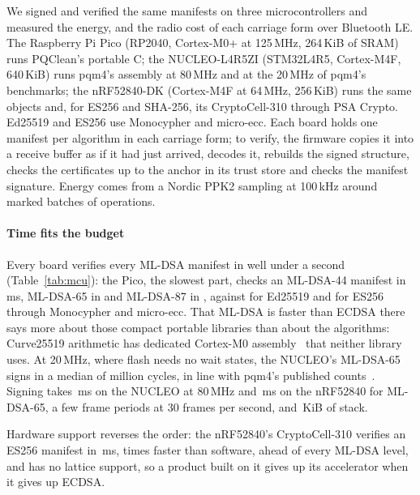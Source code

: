 We signed and verified the same manifests on three microcontrollers and
measured the energy, and the radio cost of each carriage form over Bluetooth
LE. The Raspberry Pi Pico (RP2040, Cortex-M0+ at 125\,MHz, 264\,KiB of SRAM)
runs PQClean's portable C; the NUCLEO-L4R5ZI (STM32L4R5, Cortex-M4F,
640\,KiB) runs pqm4's assembly at 80\,MHz and at the 20\,MHz of pqm4's
benchmarks; the nRF52840-DK (Cortex-M4F at 64\,MHz, 256\,KiB) runs the same
objects and, for ES256 and SHA-256, its CryptoCell-310 through PSA Crypto.
Ed25519 and ES256 use Monocypher and micro-ecc. Each board holds one
manifest per algorithm in each carriage form; to verify, the firmware copies
it into a receive buffer as if it had just arrived, decodes it, rebuilds the
signed structure, checks the certificates up to the anchor in its trust store
and checks the manifest signature. Energy comes from a Nordic PPK2 sampling at
100\,kHz around marked batches of operations.



\paragraph{Time fits the budget}
Every board verifies every ML-DSA manifest in well under a second
(Table~\ref{tab:mcu}): the Pico, the slowest part, checks an ML-DSA-44
manifest in \NpicoChainDSAfortyfour\,ms, ML-DSA-65 in
\NpicoChainDSAsixtyfive{} and ML-DSA-87 in \NpicoChainDSAeightyseven, against
\NpicoChainEd{} for Ed25519 and \NpicoChainES{} for ES256 through Monocypher
and micro-ecc. That ML-DSA is faster than ECDSA there says more about those
compact portable libraries than about the algorithms: Curve25519 arithmetic
has dedicated Cortex-M0 assembly~\cite{dull2015highspeed} that neither library
uses. At 20\,MHz, where flash needs no wait states, the NUCLEO's ML-DSA-65
signs in a median of \NnucTwentySignMcycles{} million cycles, in line with
pqm4's published counts~\cite{pqm4}. Signing takes \NnucSignDSAsixtyfive\,ms on the NUCLEO at
80\,MHz and \NnrfSignDSAsixtyfive\,ms on the nRF52840 for ML-DSA-65, a few frame
periods at 30 frames per second, and \NnucSignStackDSAsixtyfive\,KiB of stack.

Hardware support reverses the order: the nRF52840's CryptoCell-310 verifies an
ES256 manifest in \NnrfChainEShw\,ms, \NhwSpeedup{} times faster than software,
ahead of every ML-DSA level, and has no lattice support, so a product built on
it gives up its accelerator when it gives up ECDSA.



